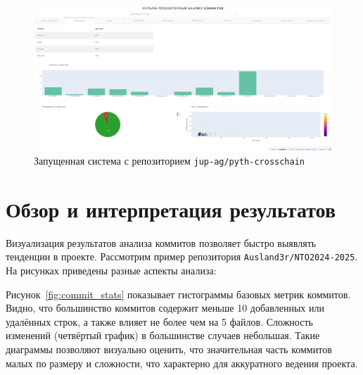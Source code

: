 \begin{itemize}
\begin{figure}[ht]
	\centering
	\includegraphics[width=\textwidth]{my_folder/images/nagruzka.png}
	\caption{Запущенная система с репозиторием \texttt{jup-ag/pyth-crosschain}}
	\label{tab:nagruzka}
\end{figure}

\section{Обзор и интерпретация результатов}
Визуализация результатов анализа коммитов позволяет быстро выявлять тенденции в проекте. Рассмотрим пример репозитория \texttt{Ausland3r/NTO2024-2025}. На рисунках приведены разные аспекты анализа:

Рисунок~\ref{fig:commit_stats} показывает гистограммы базовых метрик коммитов. Видно, что большинство коммитов содержит меньше 10 добавленных или удалённых строк, а также влияет не более чем на 5 файлов. Сложность изменений (четвёртый график) в большинстве случаев небольшая. Такие диаграммы позволяют визуально оценить, что значительная часть коммитов малых по размеру и сложности, что характерно для аккуратного ведения проекта. 


\end{itemize}

